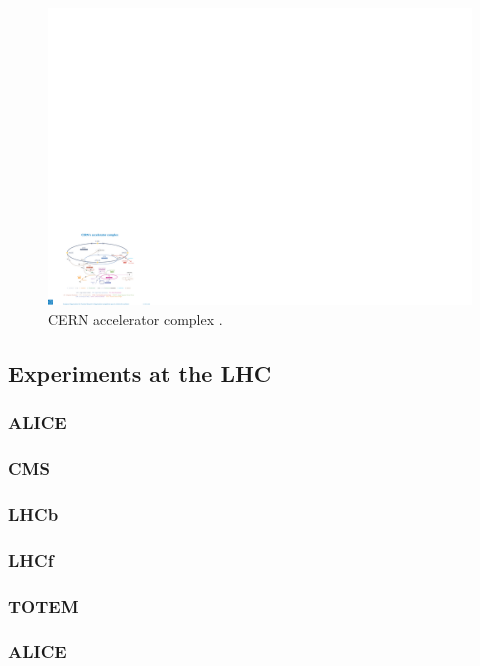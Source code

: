 \begin{figure}[ht]
\centering
\includegraphics[width=1\textwidth]{figures/lhc/acc_complex.pdf}
\caption{CERN accelerator complex \cite{Christiane:1260465}.}
\label{fig:lhc:acc}
\end{figure}

\subsection{Experiments at the LHC}

\subsubsection*{ALICE}

\subsubsection*{CMS}

\subsubsection*{LHCb}

\subsubsection*{LHCf}

\subsubsection*{TOTEM}

\subsubsection*{ALICE}

